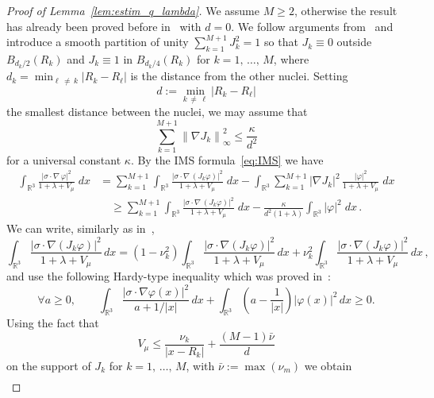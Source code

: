 \documentclass[10pt]{amsart}
\theoremstyle{definition}
\newcommand{\R}{\mathbb{R}}
\newcommand\1{{\ensuremath {\mathds 1} }}
\renewcommand\phi{\varphi}
\renewcommand{\geq}{\geqslant}
\renewcommand{\leq}{\leqslant}
\let\oldforall\forall
\renewcommand*{\forall}{\mathrel{\oldforall}}
\begin{document}
\begin{proof}[Proof of Lemma~\ref{lem:estim_q_lambda}]
We assume $M\geq2$, otherwise the result has already been proved before in~\cite{DolEstSer-00} with $d=0$. We follow arguments from~\cite{BosDolEst-08} and introduce a smooth partition of unity $\sum_{k=1}^{M+1}J_k^2=1$ so that $J_k\equiv 0$ outside $ B_{d_k/2}(R_k) $ and $J_k \equiv 1$ in $B_{d_k/4}(R_k)$ for $k=1,\,\dots,\,M$, where $d_k=\min_{\ell\,\neq\,k}|R_k-R_\ell|$ is the distance from the other nuclei. Setting
\[
d:=\min_{k\,\neq\,\ell}\left|R_k-R_\ell\right|
\]
the smallest distance between the nuclei, we may assume that
\begin{equation}\label{est-gradients}
\sum_{k=1}^{M+1} \left\|\nabla J_k\right\|_\infty^2 \le \frac{\kappa}{d^2}
\end{equation}
for a universal constant $\kappa$. By the IMS formula~\eqref{eq:IMS} we have
\begin{align*}\label{decompos}
\int_{{\R^3}}\frac{\left|\sigma\cdot\nabla\,\phi\right|^2}{1+\lambda+V_\mu}\;dx&= \sum_{k=1}^{M+1} \int_{{\R^3}} \frac{\left|\sigma \cdot \nabla\,\left(J_k \phi\right)\right|^2}{1+\lambda+V_\mu}\;dx-\int_{{\R^3}} \sum_{k=1}^{M+1}\left|\nabla J_k\right|^2\,\frac{|\phi|^2}{1+\lambda+V_\mu}\;dx\\
&\quad\geq \sum_{k=1}^{M+1} \int_{{\R^3}} \frac{\left|\sigma \cdot \nabla\,(J_k \phi)\right|^2}{1+\lambda+V_\mu}\;dx-\frac\kappa{d^2(1+\lambda)}\int_{{\R^3}}|\phi|^2\;dx\,.
\end{align*}
We can write, similarly as in~\cite[Section~1.4]{EstLewSer-19},
\[
\int_{\R^3}\frac{\left|\sigma\cdot \nabla \left(J_k\phi\right)\right|^2}{1+\lambda+V_\mu}\,dx=\left(1-\nu_k^2\right)\int_{\R^3}\frac{\left|\sigma\cdot \nabla \left(J_k\phi\right)\right|^2}{1+\lambda+V_\mu}\,dx+\nu_k^2\int_{\R^3}\frac{\left|\sigma\cdot \nabla \left(J_k\phi\right)\right|^2}{1+\lambda+V_\mu}\,dx\,,
\]
and use the following Hardy-type inequality which was proved in~\cite{DolEstLosVeg-04,DolEstSer-00}:
\begin{equation}\label{eq:Hardy-type2}
\forall a\geq0,\qquad \int_{\R^3}\frac{\left|\sigma\cdot \nabla\phi(x)\right|^2}{a+1/|x|}\,dx+\int_{\R^3}\left(a-\frac{1}{|x|}\right)|\phi(x)|^2\,dx\geq0.
\end{equation}
Using the fact that
\[
V_\mu \leq \frac{\nu_k}{\left|x-R_k\right|}+\frac{(M-1)\bar\nu}{d}
\]
on the support of $J_k$ for $k=1,\,\dots,\,M$, with $\bar\nu:=\max(\nu_m)$ we obtain
\begin{equation}\label{eq:estim_kinetic_potential}
\begin{aligned}

\end{aligned}
\end{equation}
\end{proof}
\end{document}
